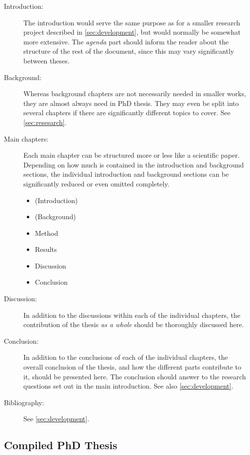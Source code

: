 \begin{description}
    \item[Introduction:] The introduction would serve the same purpose as for a smaller research project described in \cref{sec:development}, but would normally be somewhat more extensive. The \emph{agenda} part should inform the reader about the structure of the rest of the document, since this may vary significantly between theses.
    \item[Background:] Whereas background chapters are not necessarily needed in smaller works, they are almost always need in PhD thesis. They may even be split into several chapters if there are significantly different topics to cover. See \cref{sec:resesarch}.
    \item[Main chapters:] Each main chapter can be structured more or less like a scientific paper. Depending on how much is contained in the introduction and background sections, the individual introduction and background sections can be significantly reduced or even omitted completely.
    \begin{itemize}
        \item (Introduction)
        \item (Background)
        \item Method
        \item Results
        \item Discussion
        \item Conclusion
    \end{itemize}
    \item[Discussion:] In addition to the discussions within each of the individual chapters, the contribution of the thesis \emph{as a whole} should be thoroughly discussed here.
    \item[Conclusion:] In addition to the conclusions of each of the individual chapters, the overall conclusion of the thesis, and how the different parts contribute to it, should be presented here. The conclusion should answer to the research questions set out in the main introduction. See also \cref{sec:development}.
    \item[Bibliography:] See \cref{sec:development}.
\end{description}

\subsection{Compiled PhD Thesis}
\label{sec:compiledphd}

